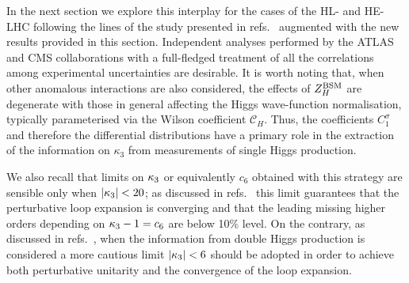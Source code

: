 In the next section we explore this interplay for the cases of the HL- and HE-LHC following the lines of the study presented in refs.~\cite{DiVita:2017eyz} augmented with the new results provided in this section. Independent analyses performed by the ATLAS and CMS collaborations with a full-fledged treatment of all the correlations among experimental uncertainties are desirable. It is worth noting that, when other anomalous interactions are also considered, the effects of  $Z_H^{\rm BSM}$ are degenerate with those in general affecting the Higgs wave-function normalisation, typically parameterised via the Wilson coefficient $\mathcal{C}_{H}$. Thus, the coefficients $C_1^{\sigma}$ and therefore the differential distributions have a primary role in the extraction of the information on $\kappa_3$ from measurements of  single Higgs production.

We also recall that limits on $\kappa_{3}$ or equivalently $c_6$ obtained with this strategy are sensible only when $|\kappa_{3}|<20$; as discussed in refs.~\cite{Degrassi:2016wml} this limit guarantees that the perturbative loop expansion is converging and that the leading missing higher orders depending on $\kappa_{3}-1=c_6$ are below 10\% level. On the contrary, as discussed in refs.~\cite{DiLuzio:2017tfn, Maltoni:2018ttu}, when the information from double Higgs production is considered a more cautious limit $|\kappa_{3}|<6$ should be adopted in order to achieve both perturbative unitarity and the convergence of the loop expansion.
 









%
%
